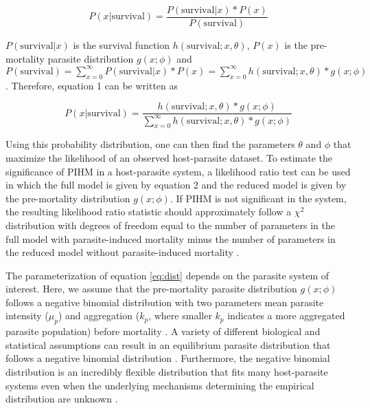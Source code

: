 \documentclass[12pt, a4paper]{article}
\begin{document}
\begin{equation}
    P(x | \text{survival}) = \dfrac{P(\text{survival} | x) * P(x)}{P(\text{survival})}
    \label{eq:concept}
\end{equation}

$P(\text{survival} | x)$ is the survival function $h(\text{survival}; x, \theta)$, $P(x)$ is the pre-mortality parasite distribution $g(x; \phi)$ and $P(\text{survival}) = \sum_{x=0}^{\infty} P(\text{survival} | x) * P(x) =  \sum_{x=0}^{\infty} h(\text{survival}; x, \theta)  * g(x; \phi)$. Therefore, equation 1 can be written as

\begin{equation}
    P(x | \text{survival}) = \dfrac{h(\text{survival}; x, \theta)  * g(x; \phi)}{\sum_{x=0}^{\infty} h(\text{survival}; x, \theta)  * g(x; \phi)}
    \label{eq:dist}
\end{equation}


Using this probability distribution, one can then find the parameters $\theta$
and $\phi$ that maximize the likelihood of an observed host-parasite dataset.
To estimate the significance of PIHM in a host-parasite system, a likelihood
ratio test can be used in which the full model is given by equation
2 and the reduced model is given by the pre-mortality distribution
$g(x; \phi)$.  If PIHM is not significant in the system, the resulting
likelihood ratio statistic should approximately follow a $\chi^2$ distribution
with degrees of freedom equal to the number of parameters in the full model with parasite-induced mortality minus the number of parameters in the reduced model without parasite-induced mortality \citep{Bolker2008}.

The parameterization of equation \ref{eq:dist} depends on the parasite system of interest.  Here, we assume that the pre-mortality parasite distribution $g(x; \phi)$ follows a negative binomial
distribution with two parameters mean parasite intensity ($\mu_p$) and
aggregation ($k_p$, where smaller $k_p$ indicates a more aggregated parasite population) before mortality \citep{Crofton1971a,AndersonandMay1978,Adjei1986}. A variety of different biological and statistical assumptions can result in an equilibrium parasite distribution that follows a negative binomial distribution
\citep{Kendall1948a, Boswell1970, Calabrese2011}. Furthermore, the negative binomial distribution is an incredibly flexible distribution that fits many host-parasite systems even when the underlying mechanisms determining the empirical distribution are unknown \citep{Shaw1998}.
\end{document}
